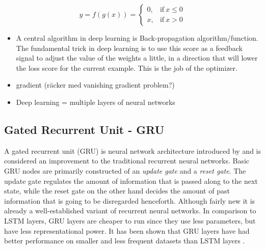 \documentclass[nofilelist]{cslthse-msc}
\begin{document}
\begin{equation}
y = f(g(x)) =
\begin{cases}
  0, & \text{if}\ x \leq 0 \\
  x, & \text{if}\ x > 0
\end{cases}
\end{equation}





\begin{itemize}
    \item A central algorithm in deep learning is Back-propagation algorithm/function. The fundamental trick in deep learning is to use this score as a feedback signal to adjust the value of the weights a little, in a direction that will lower the loss score for the current example. This is the job of the optimizer. 
    \item gradient (räcker med vanishing gradient problem?)
    \item Deep learning = multiple layers of neural networks
\end{itemize}



\subsection{Gated Recurrent Unit - GRU}
A gated recurrent unit (GRU) is neural network architecture introduced by \citet{cho2014learning} and is considered an improvement to the traditional recurrent neural networks. Basic GRU nodes are primarily constructed of an \textit{update gate} and a \textit{reset gate}. The update gate regulates the amount of information that is passed along to the next state, while the reset gate on the other hand decides the amount of past information that is going to be disregarded henceforth. 
Although fairly new it is already a well-established variant of recurrent neural networks. In comparison to LSTM layers, GRU layers are cheaper to run since they use less parameters, but have less representational power. It has been shown that GRU layers have had better performance on smaller and less frequent datasets than LSTM layers \citep{Gruber2020AreGC}.
\end{document}
